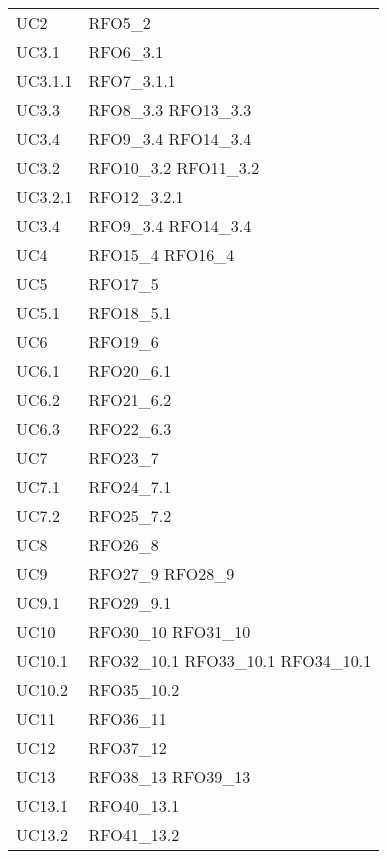 \begin{longtable}{|C{6cm} C{6cm}|}
	UC2 & RFO5\_2 \\
	
	UC3.1 & RFO6\_3.1 \\
	
    UC3.1.1 & RFO7\_3.1.1 \\
    
    UC3.3 & RFO8\_3.3 \newline RFO13\_3.3 \\ 
    
    UC3.4 & RFO9\_3.4 \newline RFO14\_3.4 \\
    UC3.2 & RFO10\_3.2 \newline RFO11\_3.2 \\
    UC3.2.1 & RFO12\_3.2.1 \\
    UC3.4 & RFO9\_3.4 \newline RFO14\_3.4 \\
    UC4 & RFO15\_4 \newline RFO16\_4 \\
    UC5 & RFO17\_5 \\
    UC5.1 & RFO18\_5.1 \\
    UC6 & RFO19\_6 \\
    UC6.1 & RFO20\_6.1 \\
    UC6.2 & RFO21\_6.2 \\
    UC6.3 & RFO22\_6.3 \\
    UC7 & RFO23\_7 \\
    UC7.1 & RFO24\_7.1 \\
    UC7.2 & RFO25\_7.2 \\
    UC8 & RFO26\_8 \\
    UC9 & RFO27\_9 \newline RFO28\_9 \\
    UC9.1 & RFO29\_9.1 \\
    UC10 & RFO30\_10 \newline RFO31\_10 \\
    UC10.1 & RFO32\_10.1 \newline RFO33\_10.1 \newline RFO34\_10.1 \\
    UC10.2 & RFO35\_10.2 \\
    UC11 & RFO36\_11 \\
    UC12 & RFO37\_12 \\
    UC13 & RFO38\_13 \newline RFO39\_13 \\
    UC13.1 & RFO40\_13.1 \\
    UC13.2 & RFO41\_13.2 \\

\end{longtable}
